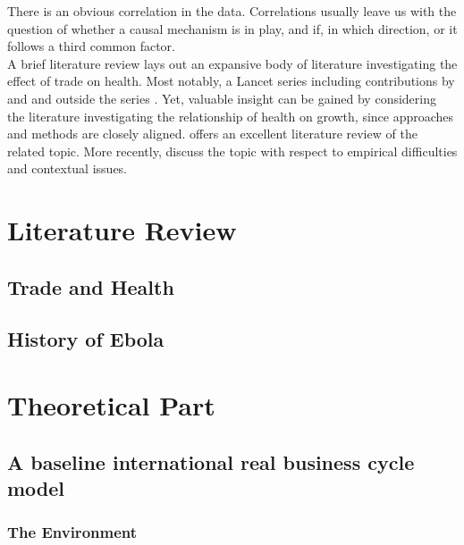 \documentclass{article}
\begin{document}
There is an obvious correlation in the data. Correlations usually leave us with the question of whether a causal mechanism is in play, and if, in which direction, or it follows a third common factor.\\
A brief literature review lays out an expansive body of literature investigating the effect of trade on health. Most notably, a Lancet series including contributions by \cite{stiglitz2009trade} and \cite{smith2009trade} and outside the series \cite{lopez2017trade}. Yet, valuable insight can be gained by considering the literature investigating the relationship of health on growth, since approaches and methods are closely aligned. \cite{weil2014health} offers an excellent literature review of the related topic. More recently, \cite{bloom2018health} discuss the topic with respect to empirical difficulties and contextual issues.

\section{Literature Review}

\subsection{Trade and Health}

\subsection{History of Ebola}



\section{Theoretical Part}

\subsection{A baseline international real business cycle model}

\subsubsection{The Environment}
\end{document}
